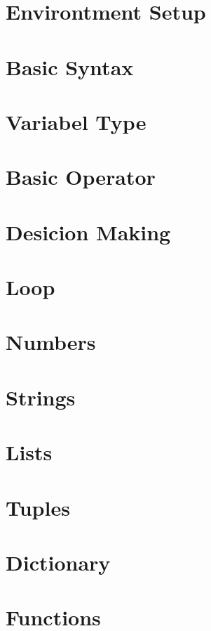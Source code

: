 \documentclass{wileySix}
\begin{document}
\chapter{Environtment Setup}

\chapter{Basic Syntax}

\chapter{Variabel Type}

\chapter{Basic Operator}

\chapter{Desicion Making}

\chapter{Loop}

\chapter{Numbers}

\chapter{Strings}

\chapter{Lists}

\chapter{Tuples}

\chapter{Dictionary}

\chapter{Functions}
\end{document}
